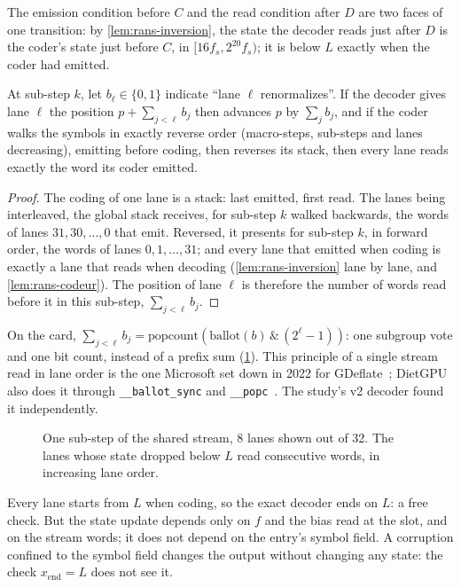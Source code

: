 The emission condition before $C$ and the read condition after $D$ are two faces of one transition: by \cref{lem:rans-inversion}, the state the decoder reads just after $D$ is the coder's state just before $C$, in $[16 f_s, 2^{20} f_s)$; it is below $L$ exactly when the coder had emitted.

\begin{lemme}\label{lem:flux-partage}
At sub-step $k$, let $b_\ell \in \{0,1\}$ indicate ``lane $\ell$ renormalizes''. If the decoder gives lane $\ell$ the position $p + \sum_{j<\ell} b_j$ then advances $p$ by $\sum_j b_j$, and if the coder walks the symbols in exactly reverse order (macro-steps, sub-steps and lanes decreasing), emitting before coding, then reverses its stack, then every lane reads exactly the word its coder emitted.
\end{lemme}

\begin{proof}
The coding of one lane is a stack: last emitted, first read. The lanes being interleaved, the global stack receives, for sub-step $k$ walked backwards, the words of lanes $31, 30, \ldots, 0$ that emit. Reversed, it presents for sub-step $k$, in forward order, the words of lanes $0, 1, \ldots, 31$; and every lane that emitted when coding is exactly a lane that reads when decoding (\cref{lem:rans-inversion} lane by lane, and \cref{lem:rans-codeur}). The position of lane $\ell$ is therefore the number of words read before it in this sub-step, $\sum_{j<\ell} b_j$.
\end{proof}

On the card, $\sum_{j<\ell} b_j = \mathrm{popcount}(\mathrm{ballot}(b) \,\&\, (2^\ell - 1))$: one subgroup vote and one bit count, instead of a prefix sum (\cref{fig:flux-partage}). This principle of a single stream read in lane order is the one Microsoft set down in 2022 for GDeflate~\cite{directstorage14}; DietGPU also does it through \texttt{\_\_ballot\_sync} and \texttt{\_\_popc}~\cite{dietgpu}. The study's v2 decoder found it independently.

\begin{figure}[ht]
\centering
\resizebox{0.96\linewidth}{!}{\SchemaFluxPartage}
\caption[The shared stream: vote and bit count]{One sub-step of the shared stream, 8 lanes shown out of 32. The lanes whose state dropped below $L$ read consecutive words, in increasing lane order.}
\label{fig:flux-partage}
\end{figure}

\begin{lemme}\label{lem:etat-table}
Every lane starts from $L$ when coding, so the exact decoder ends on $L$: a free check. But the state update depends only on $f$ and the bias read at the slot, and on the stream words; it does not depend on the entry's symbol field. A corruption confined to the symbol field changes the output without changing any state: the check $x_{\mathrm{end}} = L$ does not see it.
\end{lemme}

